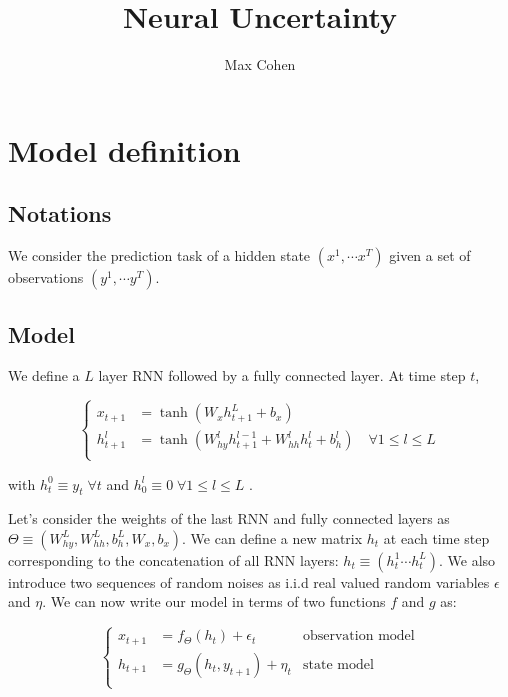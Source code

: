 \documentclass[11pt,a4paper]{report}
\begin{document}
\title{Neural Uncertainty}
\author{Max Cohen}
\maketitle

\chapter{Model definition}
\section{Notations}
We consider the prediction task of a hidden state $(x^1, \cdots x^T)$ given a set of observations $(y^1, \cdots y^T)$.

\section{Model}
We define a $L$ layer RNN followed by a fully connected layer. At time step $t$,

\begin{equation*}
    \left\{
    \begin{aligned}
        x_{t+1}   & = \tanh(W_x h_{t+1}^L + b_x)                                                               \\
        h_{t+1}^l & = \tanh(W_{hy}^l h^{l-1}_{t+1} + W_{hh}^l h^{l}_{t} + b_h^l) \quad \forall 1 \leq l \leq L \\
    \end{aligned}
    \right.
\end{equation*}

with $h_{t}^0 \equiv y_{t} \; \forall t$ and $h_{0}^l \equiv 0 \; \forall 1 \leq l \leq L$ .

Let's consider the weights of the last RNN and fully connected layers as $\Theta \equiv (W_{hy}^L, W_{hh}^L, b_h^L, W_x, b_x)$. We can define a new matrix $h_t$ at each time step corresponding to the concatenation of all RNN layers: $h_t \equiv (h_t^1 \cdots h_t^L)$. We also introduce two sequences of random noises as i.i.d real valued random variables $\epsilon$ and $\eta$. We can now write our model in terms of two functions $f$ and $g$ as:

\begin{equation}
    \left\{
    \begin{aligned}
        x_{t+1} & = f_\Theta(h_t) + \epsilon_t      & \text{observation model} \\
        h_{t+1} & = g_\Theta(h_t, y_{t+1}) + \eta_t & \text{state model}       \\
    \end{aligned}
    \right.
\end{equation}
\end{document}

